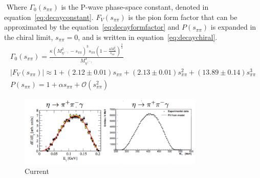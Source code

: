 \documentclass{aip-cp}
\begin{document}
 Where $\Gamma_0(s_{\pi\pi})$ is the P-wave phase-space constant, denoted in equation~\ref{eq:decayconstant}. $F_V(s_{\pi\pi})$ is the pion form factor that can be approximated by the equation~\ref{eq:decayformfactor} and  $P(s_{\pi\pi})$ is expanded in the chiral limit, $s_{\pi\pi} = 0$, and is written in equation~\ref{eq:decaychiral}.
\begin{eqnarray}
\Gamma_0(s_{\pi\pi}) = \frac{\kappa \left(M^2_{\eta^{(\prime)}} - s_{\pi\pi} \right)^3  s_{\pi\pi} \left(1- \frac{ 4M^2_{\pi }}{    s_{\pi\pi}  }\right)^{\frac{3}{2}}   }{M^3_{\eta^{(\prime)} }}  \label{eq:decayconstant}  \\
\vert F_V(s_{\pi\pi}) \vert \approx 1+(2.12\pm0.01)s_{\pi\pi} + (2.13\pm0.01)s_{\pi\pi}^2+(13.89\pm0.14)s_{\pi\pi}^3 \label{eq:decayformfactor} \\
P(s_{\pi\pi}) = 1 + \alpha s_{\pi\pi} + \mathcal{O}(s_{\pi\pi}^2) \label{eq:decaychiral}
\end{eqnarray}

\begin{figure}[h]
	\centerline{\includegraphics[width=250pt]{figures/Box_wasa_kloe.pdf}}
	\caption{Current }
	\label{fig:boswasakloe}
\end{figure}
\end{document}
